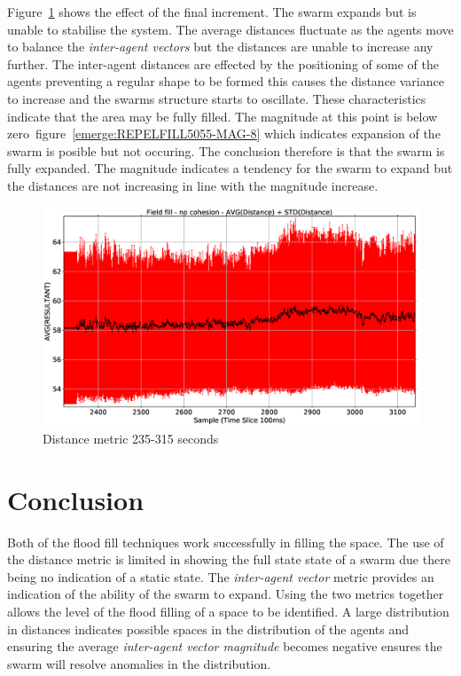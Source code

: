 Figure~\ref{emerge:REPELFILL5055-DIST-8} shows the effect of the final increment. The swarm expands but is unable to stabilise the system. The average distances fluctuate as the agents move to balance the \textit{inter-agent vectors} but the distances are unable to increase any further. The inter-agent distances are effected by the positioning of some of the agents preventing a regular shape to be formed this causes the distance variance to increase and the swarms structure starts to oscillate. These characteristics indicate that the area may be fully filled. The magnitude at this point is below zero~figure~\ref{emerge:REPELFILL5055-MAG-8} which indicates expansion of the swarm is posible but not occuring. The conclusion therefore is that the swarm is fully expanded. The magnitude indicates a tendency for the swarm to expand but the distances are not increasing in line with the magnitude increase. 

\begin{figure}[H]
\begin{center}
\includegraphics[width=12cm]{CHAPTER-8/figures/REPELFILL5055-DIST-8}
\end{center}
\caption{Distance metric 235-315 seconds\label{emerge:REPELFILL5055-DIST-8}}
\end{figure}

\section{Conclusion}
Both of the flood fill techniques work successfully in filling the space. The use of the distance metric is limited in showing the full state state of a swarm due there being no indication of a static state. The \textit{inter-agent vector} metric provides an indication of the ability of the swarm to expand. Using the two metrics together allows the level of the flood filling of a space to be identified. A large distribution in distances indicates possible spaces in the distribution of the agents and ensuring the average \textit{inter-agent vector magnitude} becomes negative ensures the swarm will resolve anomalies in the distribution.

